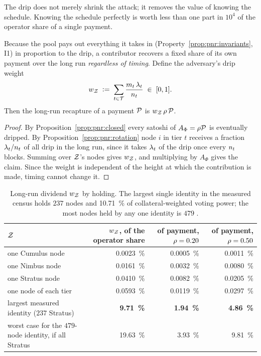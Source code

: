 The drip does not merely shrink the attack; it removes the value of knowing the schedule.
Knowing the schedule perfectly is worth less than one part in $10^{4}$ of the operator share of a
single payment.

\begin{proposition}
\label{prop:pnr:dividend}
Because the pool pays out everything it takes in (Property~\ref{prop:pnr:invariants}, I1) in
proportion to the drip, a contributor recovers a fixed share of its own payment over the long run
\emph{regardless of timing}. Define the adversary's drip weight
\[
  w_{\mathcal{Z}} \;\vcentcolon=\; \sum_{t \in \mathcal{T}} \frac{m_t\,\lambda_{t}}{n_{t}}
  \;\in\; [0,1].
\]
Then the long-run recapture of a payment $\mathcal{P}$ is $w_{\mathcal{Z}}\,\rho\,\mathcal{P}$.
\end{proposition}

\begin{proof}
By Proposition~\ref{prop:pnr:closed} every satoshi of $A_\Phi = \rho\mathcal{P}$ is eventually
dripped. By Proposition~\ref{prop:pnr:rotation} node $i$ in tier $t$ receives a fraction
$\lambda_{t}/n_{t}$ of all drip in the long run, since it takes $\lambda_{t}$ of the drip
once every $n_{t}$ blocks. Summing over $\mathcal{Z}$'s nodes gives $w_{\mathcal{Z}}$, and multiplying by
$A_\Phi$ gives the claim. Since the weight is independent of the height at which the contribution is
made, timing cannot change it.
\end{proof}

\begin{table}[H]
\centering
\small
\begin{tabular}{lrrr}
\toprule
$\mathcal{Z}$ & $w_{\mathcal{Z}}$, of the operator share & of payment, $\rho = 0.20$ & of payment, $\rho = 0.50$\\
\midrule
one Cumulus node   & \SI{0.0023}{\percent} & \SI{0.0005}{\percent} & \SI{0.0011}{\percent}\\
one Nimbus node    & \SI{0.0161}{\percent} & \SI{0.0032}{\percent} & \SI{0.0080}{\percent}\\
one Stratus node   & \SI{0.0410}{\percent} & \SI{0.0082}{\percent} & \SI{0.0205}{\percent}\\
one node of each tier & \SI{0.0593}{\percent} & \SI{0.0119}{\percent} & \SI{0.0297}{\percent}\\
largest measured identity ($237$ Stratus) & \textbf{\SI{9.71}{\percent}} & \textbf{\SI{1.94}{\percent}} & \textbf{\SI{4.86}{\percent}}\\
worst case for the $479$-node identity, if all Stratus & \SI{19.63}{\percent} & \SI{3.93}{\percent} & \SI{9.81}{\percent}\\
\bottomrule
\end{tabular}
\caption{Long-run dividend $w_{\mathcal{Z}}$ by holding. The largest single identity in the measured
census holds $237$ nodes and \SI{10.71}{\percent} of collateral-weighted voting power; the most
nodes held by any one identity is $479$
.}
\label{tab:pnr:dividend}
\end{table}

